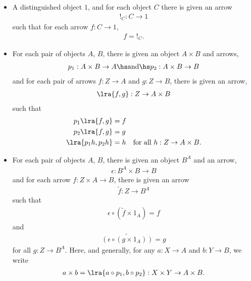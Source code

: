 \documentclass{article}
\begin{document}
\begin{proposition}[Awodey p. 134]
    \begin{itemize}
        \item A distinguished object $1$, and for each object $C$ there
        is given an arrow \begin{align*}
            !_C:C\to 1
        \end{align*}
        such that for each arrow $f:C\to 1$, \begin{align*}
            f=!_C.
        \end{align*}
        \item For each pair of objects $A$, $B$, there is given an object
        $A\times B$ and arrows, \begin{align*}
            p_1:A\times B \to A\hs\text{and}\hs p_2:A\times B\to B
        \end{align*}
        and for each pair of arrows $f:Z\to A$ and $g:Z\to B$, there is given
        an arrow, \begin{align*}
            \lra{f,g}:Z\to A\times B
        \end{align*}
        such that \begin{align*}
            p_1\lra{f,g}&=f\\
            p_2\lra{f,g}&=g\\
            \lra{p_1h,p_2h}&=h &\text{for all }h:Z\to A\times B.
        \end{align*}
        \item For each pair of objects $A$, $B$, there is given an object 
        $B^A$ and an arrow, \begin{align*}
            \epsilon : B^A\times B \to B
        \end{align*}
        and for each arrow $f:Z\times A \to B$, there is given an arrow \begin{align*}
            \tilde{f}:Z\to B^A
        \end{align*}
        such that \begin{align*}
            \epsilon\circ(\tilde f \times 1_A)=f
        \end{align*}
        and \begin{align*}
            \widetilde{(\epsilon\circ(g\times 1_A))}=g
        \end{align*}
        for all $g:Z\to B^A$. Here, and generally, for any $a:X\to A$ and
        $b:Y\to B$, we write
        \begin{align*}
            a\times b = \lra{a\circ p_1, b\circ p_2}:X\times Y\to A\times B.
        \end{align*}
    \end{itemize}
\end{proposition}
\end{document}
